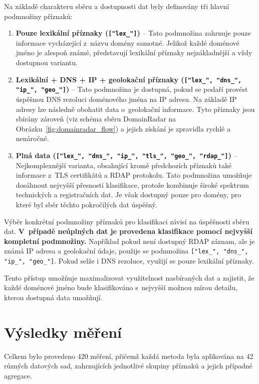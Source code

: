 Na základě charakteru sběru a dostupnosti dat byly definovány tři hlavní podmnožiny příznaků:

\begin{enumerate}
    \item \textbf{Pouze lexikální příznaky (\texttt{["lex\_"]})} – Tato podmnožina zahrnuje pouze informace vycházející z~názvu domény samotné. Jelikož každé doménové jméno je alespoň známé, představují lexikální příznaky nejzákladnější a vždy dostupnou variantu.
    
    \item \textbf{Lexikální + DNS + IP + geolokační příznaky (\texttt{["lex\_", "dns\_", "ip\_", "geo\_"]})} – Tato podmnožina je dostupná, pokud se podaří provést úspěšnou DNS rezoluci doménového jména na IP adresu. Na základě IP adresy lze následně obohatit data o~geolokační informace. Tyto příznaky jsou sbírány zároveň (viz schéma sběru DomainRadar na Obrázku~\ref{fig:domainradar_flow}) a jejich získání je zpravidla rychlé a nenáročné.
    
    \item \textbf{Plná data (\texttt{["lex\_", "dns\_", "ip\_", "tls\_", "geo\_", "rdap\_"]})} – Nejkomplexnější varianta, obsahující kromě předchozích příznaků také informace z~TLS certifikátů a RDAP protokolu. Tato podmnožina umožňuje dosáhnout nejvyšší přesnosti klasifikace, protože kombinuje široké spektrum technických a registračních dat. Je však dostupný pouze pro domény, pro které byl sběr těchto pokročilých dat úspěšný.
\end{enumerate}

Výběr konkrétní podmnožiny příznaků pro klasifikaci závisí na úspěšnosti sběru dat.  
\textbf{V~případě neúplných dat je provedena klasifikace pomocí nejvyšší kompletní podmnožiny.}  
Například pokud není dostupný RDAP záznam, ale je známá IP adresa a geolokační údaje, použije se podmnožina \texttt{["lex\_", "dns\_", "ip\_", "geo\_"]}.  
Pokud selže i DNS rezoluce, využijí se pouze lexikální příznaky.

Tento přístup umožňuje maximalizovat využitelnost nasbíraných dat a zajistit, že každé doménové jméno bude klasifikováno s~nejvyšší možnou mírou detailu, kterou dostupná data umožňují.




\section{Výsledky měření}

Celkem bylo provedeno 420 měření, přičemž každá metoda byla aplikována na 42 různých datových sad, zahrnujících jednotlivé skupiny příznaků a jejich případné agregace. 

